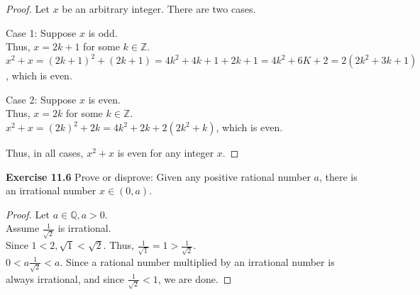 \documentclass[12pt,oneside]{article}
\newenvironment{exercise}[1]{\vspace{.1in}\noindent\textbf{Exercise #1 \hspace{.05em}}}{}
\newcommand{\Z}{\mathbb{Z}}
\newcommand{\Q}{\mathbb{Q}}
\begin{document}
\begin{proof}
Let $x$ be an arbitrary integer. There are two cases.

Case 1: Suppose $x$ is odd.\\
Thus, $x=2k+1$ for some $k \in \Z$.\\
$x^{2}+x=(2k+1)^{2}+(2k+1)=4k^{2}+4k+1+2k+1=4k^{2}+6K+2=2(2k^{2}+3k+1)$, which is even.

Case 2: Suppose $x$ is even.\\
Thus, $x=2k$ for some $k \in \Z$.\\
$x^{2}+x=(2k)^{2}+2k=4k^{2}+2k+2(2k^{2}+k)$, which is even.

Thus, in all cases, $x^{2}+x$ is even for any integer $x$.
\end{proof}

\begin{exercise}{11.6}
Prove or disprove: Given any positive rational number $a$, there is an irrational number $x \in (0,a)$.
\end{exercise}

\begin{proof}
Let $a \in \Q, a > 0$.\\
Assume $\frac{1}{\sqrt{2}}$ is irrational.\\
Since $1<2, \sqrt{1} < \sqrt{2}$. Thus, $\frac{1}{\sqrt{1}} = 1 > \frac{1}{\sqrt{2}}$.\\
$0 < a\frac{1}{\sqrt{2}} < a$. Since a rational number multiplied by an irrational number is always irrational, and since $\frac{1}{\sqrt{2}} < 1$, we are done.
\end{proof}
\end{document}
